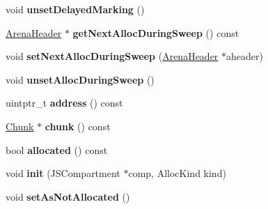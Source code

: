 \begin{DoxyCompactItemize}
\item 
\hypertarget{structjs_1_1gc_1_1_arena_header_ae5f53db848a89a9bb96b21b37967931d}{void {\bfseries unset\-Delayed\-Marking} ()}\label{structjs_1_1gc_1_1_arena_header_ae5f53db848a89a9bb96b21b37967931d}

\item 
\hypertarget{structjs_1_1gc_1_1_arena_header_a5fe0992be44b11aa14bc6fec6bf09c60}{\hyperlink{structjs_1_1gc_1_1_arena_header}{Arena\-Header} $\ast$ {\bfseries get\-Next\-Alloc\-During\-Sweep} () const }\label{structjs_1_1gc_1_1_arena_header_a5fe0992be44b11aa14bc6fec6bf09c60}

\item 
\hypertarget{structjs_1_1gc_1_1_arena_header_a83e1fc854c0c4f5c7609cc64e406d2b5}{void {\bfseries set\-Next\-Alloc\-During\-Sweep} (\hyperlink{structjs_1_1gc_1_1_arena_header}{Arena\-Header} $\ast$aheader)}\label{structjs_1_1gc_1_1_arena_header_a83e1fc854c0c4f5c7609cc64e406d2b5}

\item 
\hypertarget{structjs_1_1gc_1_1_arena_header_abf111f8b6c61130550eb5e26ca3e45ad}{void {\bfseries unset\-Alloc\-During\-Sweep} ()}\label{structjs_1_1gc_1_1_arena_header_abf111f8b6c61130550eb5e26ca3e45ad}

\item 
\hypertarget{structjs_1_1gc_1_1_arena_header_aa2f3ff8445f19ee01d17b03a42a2305a}{uintptr\-\_\-t {\bfseries address} () const }\label{structjs_1_1gc_1_1_arena_header_aa2f3ff8445f19ee01d17b03a42a2305a}

\item 
\hypertarget{structjs_1_1gc_1_1_arena_header_adcdfba3a76dfe10bd82f64326a43fd3c}{\hyperlink{structjs_1_1gc_1_1_chunk}{Chunk} $\ast$ {\bfseries chunk} () const }\label{structjs_1_1gc_1_1_arena_header_adcdfba3a76dfe10bd82f64326a43fd3c}

\item 
\hypertarget{structjs_1_1gc_1_1_arena_header_a6a1486aa87c78ebd2fbfcf863c9320c7}{bool {\bfseries allocated} () const }\label{structjs_1_1gc_1_1_arena_header_a6a1486aa87c78ebd2fbfcf863c9320c7}

\item 
\hypertarget{structjs_1_1gc_1_1_arena_header_ab813e5b60976fe7200528ee9ecead2b7}{void {\bfseries init} (J\-S\-Compartment $\ast$comp, Alloc\-Kind kind)}\label{structjs_1_1gc_1_1_arena_header_ab813e5b60976fe7200528ee9ecead2b7}

\item 
\hypertarget{structjs_1_1gc_1_1_arena_header_a250546ae521fdaf268d62486979a45ad}{void {\bfseries set\-As\-Not\-Allocated} ()}\label{structjs_1_1gc_1_1_arena_header_a250546ae521fdaf268d62486979a45ad}


\end{DoxyCompactItemize}
